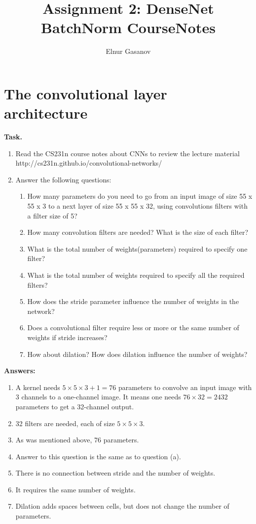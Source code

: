 \documentclass{article}
\title{Assignment 2: DenseNet BatchNorm CourseNotes}
\author{Elnur Gasanov}
\date{}
\begin{document}
\maketitle
\section{The convolutional layer architecture}

{\bfseries Task.} 
\begin{enumerate}
	\item Read the CS231n course notes about CNNs to review the lecture material http://cs231n.github.io/convolutional-networks/
	\item Answer the following questions: 
	\begin{enumerate}
		\item How many parameters do you need to go from an input image of size 55 x 55 x 3 to a next layer of size 55 x 55 x 32, using convolutions filters with a filter size of 5?
		\item How many convolution filters are needed? What is the size of each filter?
		\item What is the total number of weights(parameters) required to specify one filter?
		\item What is the total number of weights required to specify all the required filters?
		\item How does the stride parameter influence the number of weights in the network?
		\item Does a convolutional filter require less or more or the same number of weights if stride increases?
		\item How about dilation? How does dilation influence the number of weights?
	\end{enumerate}
\end{enumerate}
{\bfseries Answers:}
\begin{enumerate}[label=(\alph*)]
	\item A kernel needs $5 \times 5 \times 3 + 1 = 76$ parameters to convolve an input image with 3 channels to a one-channel image. It means one needs $76 \times 32 = 2432$ parameters to get a 32-channel output.
	\item 32 filters are needed, each of size $5 \times 5 \times 3$.
	\item As was mentioned above, 76 parameters.
	\item Answer to this question is the same as to question (a).
	\item There is no connection between stride and the number of weights.
	\item It requires the same number of weights.
	\item Dilation adds spaces between cells, but does not change the number of parameters.
\end{enumerate}
\end{document}
